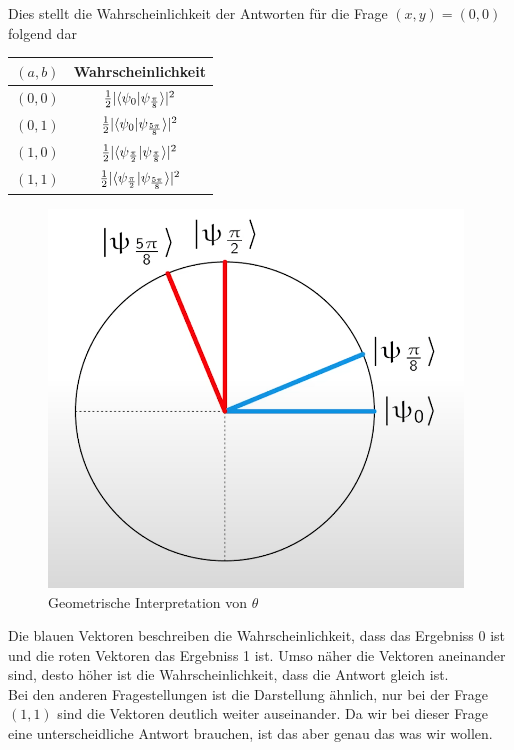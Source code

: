 Dies stellt die Wahrscheinlichkeit der Antworten für die Frage $(x, y) = (0, 0)$ folgend dar\\

\begin{center}
    \begin{tabular}{c|c}
    $(a, b)$ & Wahrscheinlichkeit \\ \hline
    $(0, 0)$ & $\frac{1}{2}\lvert \braket{\psi_0 | \psi_\frac{\pi}{8}} \rvert^2$  \\
    $(0, 1)$ & $\frac{1}{2}\lvert \braket{\psi_0 | \psi_\frac{5\pi}{8}} \rvert^2$  \\
    $(1, 0)$ & $\frac{1}{2}\lvert \braket{\psi_\frac{\pi}{2} | \psi_\frac{\pi}{8}} \rvert^2$  \\
    $(1, 1)$ & $\frac{1}{2}\lvert \braket{\psi_\frac{\pi}{2} | \psi_\frac{5\pi}{8}} \rvert^2$
    \end{tabular}
\end{center}

\begin{figure}[H]
    \centering
    \includegraphics[width=0.6\linewidth]{img/CHSH-geometric.png}
    \caption{Geometrische Interpretation von $\theta$ \protect\cite[1h3m]{IBM_chsh_2025}}
    \label{fig:CHSHGeometric}
\end{figure}

Die blauen Vektoren beschreiben die Wahrscheinlichkeit, dass das Ergebniss 0 ist und die roten Vektoren das Ergebniss 1 ist.
Umso näher die Vektoren aneinander sind, desto höher ist die Wahrscheinlichkeit, dass die Antwort gleich ist.\\

Bei den anderen Fragestellungen ist die Darstellung ähnlich, nur bei der Frage $(1, 1)$ sind die Vektoren deutlich weiter auseinander.
Da wir bei dieser Frage eine unterscheidliche Antwort brauchen, ist das aber genau das was wir wollen.\\

